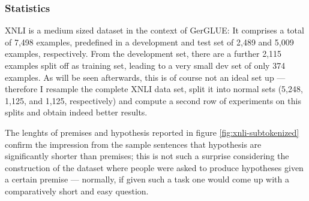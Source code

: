 \subsubsection{Statistics}

XNLI is a medium sized dataset in the context of GerGLUE: It comprises a total of 7,498 examples,
predefined in a development and test set of 2,489 and 5,009 examples, respectively. From the
development set, there are a further 2,115 examples split off as training set, leading to a very
small dev set of only 374 examples. As will be seen afterwards, this is of course not an ideal set
up --- therefore I resample the complete XNLI data set, split it into normal sets (5,248, 1,125,
and 1,125, respectively) and compute a second {\color{red} row} of experiments on this splits and
obtain indeed better results.

The lenghts of premises and hypothesis reported in figure \ref{fig:xnli-subtokenized} confirm the
impression from the sample sentences that hypothesis are significantly shorter than premises;
this is not such a surprise considering the construction of the dataset where people were asked
to produce hypotheses given a certain premise --- normally, if given such a task one would come
up with a comparatively short {\color{red} and easy} question.










